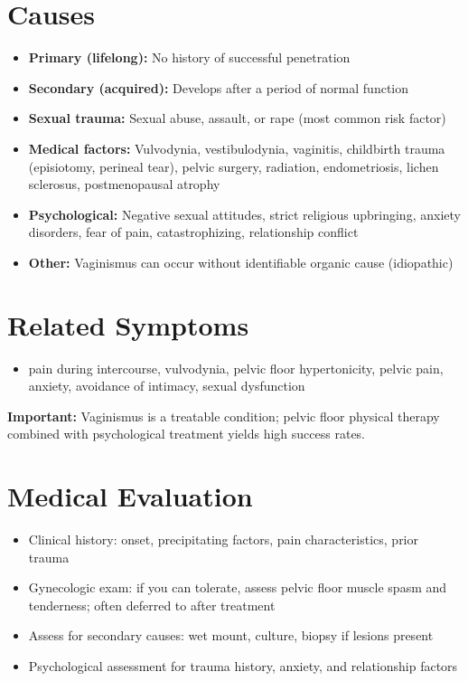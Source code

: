 \section*{Causes}
\begin{itemize}
  \item \textbf{Primary (lifelong):} No history of successful penetration
  \item \textbf{Secondary (acquired):} Develops after a period of normal function
  \item \textbf{Sexual trauma:} Sexual abuse, assault, or rape (most common risk factor)
  \item \textbf{Medical factors:} Vulvodynia, vestibulodynia, vaginitis, childbirth trauma (episiotomy, perineal tear), pelvic surgery, radiation, endometriosis, lichen sclerosus, postmenopausal atrophy
  \item \textbf{Psychological:} Negative sexual attitudes, strict religious upbringing, anxiety disorders, fear of pain, catastrophizing, relationship conflict
  \item \textbf{Other:} Vaginismus can occur without identifiable organic cause (idiopathic)
\end{itemize}

\section*{Related Symptoms}
\begin{itemize}
  \item pain during intercourse, vulvodynia, pelvic floor hypertonicity, pelvic pain, anxiety, avoidance of intimacy, sexual dysfunction
\end{itemize}
\textbf{Important:} Vaginismus is a treatable condition; pelvic floor physical therapy combined with psychological treatment yields high success rates.

\section*{Medical Evaluation}
\begin{itemize}
  \item Clinical history: onset, precipitating factors, pain characteristics, prior trauma
  \item Gynecologic exam: if you can tolerate, assess pelvic floor muscle spasm and tenderness; often deferred to after treatment
  \item Assess for secondary causes: wet mount, culture, biopsy if lesions present
  \item Psychological assessment for trauma history, anxiety, and relationship factors
\end{itemize}

